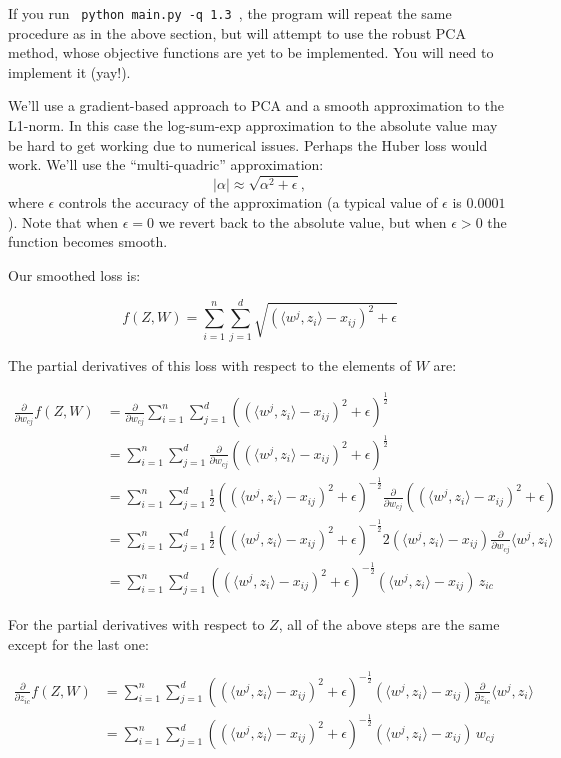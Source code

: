 \documentclass{article}
\begin{document}
If you run \verb| python main.py -q 1.3 |, the program will repeat the same procedure as in the above section, but will attempt to use the robust PCA method, whose objective functions are yet to be implemented. You will need to implement it (yay!).

We'll use a gradient-based approach to PCA and a smooth approximation to the L1-norm. In this case the log-sum-exp approximation to the absolute value may be hard to get working due to numerical issues. Perhaps the Huber loss would work. We'll use the ``multi-quadric'' approximation:
\[
|\alpha| \approx \sqrt{\alpha^2 + \epsilon},
\]
where $\epsilon$ controls the accuracy of the approximation (a typical value of $\epsilon$ is $0.0001$). Note that when $\epsilon=0$ we revert back to the absolute value, but when $\epsilon>0$ the function becomes smooth.

Our smoothed loss is:

\[
f(Z,W) = \sum_{i=1}^n\sum_{j=1}^d \sqrt{(\langle w^j, z_i\rangle - x_{ij})^2 + \epsilon }
\]

The partial derivatives of this loss with respect to the elements of $W$ are:

\begin{align*}
\frac{\partial}{\partial w_{cj}} f(Z,W) &= \frac{\partial}{\partial w_{cj}} \sum_{i=1}^n\sum_{j=1}^d \left( (\langle w^j, z_i\rangle - x_{ij})^2 + \epsilon \right)^{\frac12} \\
 &= \sum_{i=1}^n\sum_{j=1}^d  \frac{\partial}{\partial w_{cj}} \left( (\langle w^j, z_i\rangle - x_{ij})^2 + \epsilon \right)^{\frac12} \\
  &= \sum_{i=1}^n\sum_{j=1}^d  \frac12 \left( (\langle w^j, z_i\rangle - x_{ij})^2 + \epsilon \right)^{-\frac12} \frac{\partial}{\partial w_{cj}} \left( (\langle w^j, z_i\rangle - x_{ij})^2 + \epsilon \right) \\
  &= \sum_{i=1}^n\sum_{j=1}^d  \frac12  \left( (\langle w^j, z_i\rangle - x_{ij})^2 + \epsilon \right)^{-\frac12} 2  (\langle w^j, z_i\rangle - x_{ij})  \frac{\partial}{\partial w_{cj}} \langle w^j, z_i\rangle \\
  &= \sum_{i=1}^n\sum_{j=1}^d  \left( (\langle w^j, z_i\rangle - x_{ij})^2 + \epsilon \right)^{-\frac12}  (\langle w^j, z_i\rangle - x_{ij}) \, z_{ic}
\end{align*}

For the partial derivatives with respect to $Z$, all of the above steps are the same except for the last one:

\begin{align*}
\frac{\partial}{\partial z_{ic}} f(Z,W)  &= \sum_{i=1}^n\sum_{j=1}^d  \left( (\langle w^j, z_i\rangle - x_{ij})^2 + \epsilon \right)^{-\frac12}   (\langle w^j, z_i\rangle - x_{ij})  \frac{\partial}{\partial z_{ic}} \langle w^j, z_i\rangle \\
  &= \sum_{i=1}^n\sum_{j=1}^d  \left( (\langle w^j, z_i\rangle - x_{ij})^2 + \epsilon \right)^{-\frac12}  (\langle w^j, z_i\rangle - x_{ij}) \, w_{cj}
\end{align*}
\end{document}

